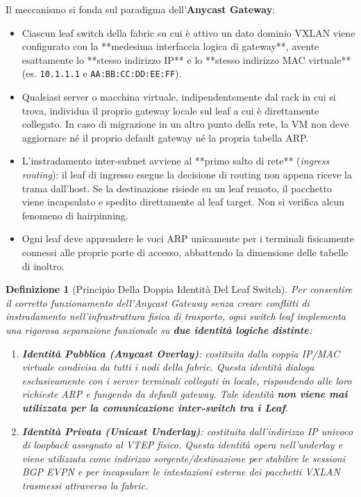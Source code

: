 \documentclass[11pt, a4paper]{article}
\newtheorem{theorem}{Definizione}
\begin{document}
Il meccanismo si fonda sul paradigma dell'\textbf{Anycast Gateway}:
\begin{itemize}
    \item Ciascun leaf switch della fabric su cui è attivo un dato dominio VXLAN viene configurato con la **medesima interfaccia logica di gateway**, avente esattamente lo **stesso indirizzo IP** e lo **stesso indirizzo MAC virtuale** (es. \texttt{10.1.1.1} e \texttt{AA:BB:CC:DD:EE:FF}).
    \item Qualsiasi server o macchina virtuale, indipendentemente dal rack in cui si trova, individua il proprio gateway locale sul leaf a cui è direttamente collegato. In caso di migrazione in un altro punto della rete, la VM non deve aggiornare né il proprio default gateway né la propria tabella ARP.
    \item L'instradamento inter-subnet avviene al **primo salto di rete** (\emph{ingress routing}): il leaf di ingresso esegue la decisione di routing non appena riceve la trama dall'host. Se la destinazione risiede su un leaf remoto, il pacchetto viene incapsulato e spedito direttamente al leaf target. Non si verifica alcun fenomeno di hairpinning.
    \item Ogni leaf deve apprendere le voci ARP unicamente per i terminali fisicamente connessi alle proprie porte di accesso, abbattendo la dimensione delle tabelle di inoltro.
\end{itemize}

\begin{theorem}[Principio Della Doppia Identità Del Leaf Switch]
Per consentire il corretto funzionamento dell'Anycast Gateway senza creare conflitti di instradamento nell'infrastruttura fisica di trasporto, ogni switch leaf implementa una rigorosa separazione funzionale su \textbf{due identità logiche distinte}:
\begin{enumerate}
    \item \textbf{Identità Pubblica (Anycast Overlay)}: costituita dalla coppia IP/MAC virtuale condivisa da tutti i nodi della fabric. Questa identità dialoga \emph{esclusivamente con i server terminali} collegati in locale, rispondendo alle loro richieste ARP e fungendo da default gateway. Tale identità \textbf{non viene mai utilizzata per la comunicazione inter-switch tra i Leaf}.
    \item \textbf{Identità Privata (Unicast Underlay)}: costituita dall'indirizzo IP univoco di loopback assegnato al VTEP fisico. Questa identità opera nell'underlay e viene utilizzata come indirizzo sorgente/destinazione per stabilire le sessioni BGP EVPN e per incapsulare le intestazioni esterne dei pacchetti VXLAN trasmessi attraverso la fabric.
\end{enumerate}
\end{theorem}
\end{document}

